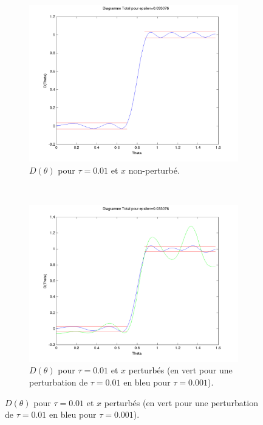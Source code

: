 \begin{figure}[h!]
  \centering
  \begin{subfigure}[b]{0.45\textwidth}
  \includegraphics[width=\textwidth]{D-ModRobust1-01.png}
  \caption{$D(\theta)$ pour $\tau = 0.01$ et $x$ non-perturbé.}
  \label{fig:D-ModRobust1-01}
  \end{subfigure}%
  ~ 
  \begin{subfigure}[b]{0.45\textwidth}
  \includegraphics[width=\textwidth]{D-ModRobust1-testRob01.png}
  \caption{$D(\theta)$ pour $\tau = 0.01$ et $x$ perturbés (en vert pour une perturbation de $\tau=0.01$ en bleu pour $\tau=0.001$).}
  \label{fig:D-ModRobust1-testRob01}
  \end{subfigure}

\end{figure}
